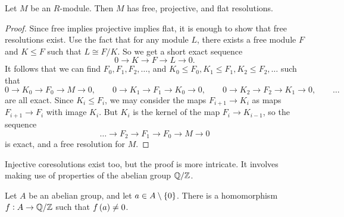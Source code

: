 \begin{proposition}
Let $ M $ be an $ R $-module. Then $ M $ has free, projective, and flat resolutions.
\end{proposition}

\begin{proof}
Since free implies projective implies flat, it is enough to show that free resolutions exist. Use the fact that for any module $ L $, there exists a free module $ F $ and $ K \le F $ such that $ L \cong F / K $. So we get a short exact sequence
$$ 0 \to K \to F \to L \to 0. $$
It follows that we can find $ F_0, F_1, F_2, \dots $, and $ K_0 \le F_0, K_1 \le F_1, K_2 \le F_2, \dots $ such that
$$ 0 \to K_0 \to F_0 \to M \to 0, \qquad 0 \to K_1 \to F_1 \to K_0 \to 0, \qquad 0 \to K_2 \to F_2 \to K_1 \to 0, \qquad \dots $$
are all exact. Since $ K_i \le F_i $, we may consider the maps $ F_{i + 1} \to K_i $ as maps $ F_{i + 1} \to F_i $ with image $ K_i $. But $ K_i $ is the kernel of the map $ F_i \to K_{i - 1} $, so the sequence
$$ \dots \to F_2 \to F_1 \to F_0 \to M \to 0 $$
is exact, and a free resolution for $ M $.
\end{proof}

Injective coresolutions exist too, but the proof is more intricate. It involves making use of properties of the abelian group $ \mathbb{Q} / \mathbb{Z} $.

\begin{proposition}
Let $ A $ be an abelian group, and let $ a \in A \setminus \cbr{0} $. There is a homomorphism $ f : A \to \mathbb{Q} / \mathbb{Z} $ such that $ f\br{a} \ne 0 $. %
\end{proposition}


